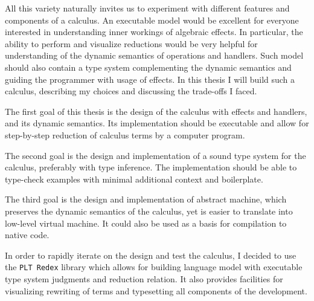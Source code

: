 \documentclass[inz, english, shortabstract]{iithesis}
\newcommand{\Redex}{\texttt{PLT Redex}}
\begin{document}
All this variety naturally invites us to experiment with different features and components of a calculus.
An executable model would be excellent for everyone interested in understanding inner workings of algebraic effects.
In particular, the ability to perform and visualize reductions would be very helpful for understanding of the dynamic semantics of operations and handlers.
Such model should also contain a type system complementing the dynamic semantics and guiding the programmer with usage of effects.
In this thesis I will build such a calculus, describing my choices and discussing the trade-offs I faced.

The first goal of this thesis is the design of the calculus with effects and handlers, and its dynamic semantics.
Its implementation should be executable and allow for step-by-step reduction of calculus terms by a computer program.

The second goal is the design and implementation of a sound type system for the calculus, preferably with type inference.
The implementation should be able to type-check examples with minimal additional context and boilerplate.

The third goal is the design and implementation of abstract machine, which preserves the dynamic semantics of the calculus, yet is easier to translate into low-level virtual machine.
It could also be used as a basis for compilation to native code.

In order to rapidly iterate on the design and test the calculus, I decided to use the \Redex{} library which allows for building language model with executable type system judgments and reduction relation.
It also provides facilities for visualizing rewriting of terms and typesetting all components of the development.
\end{document}
